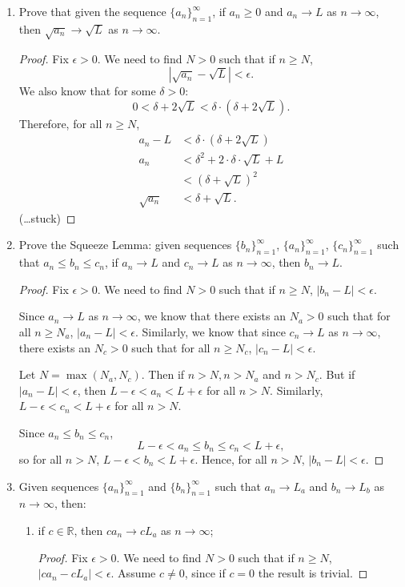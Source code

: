 \documentclass[12pt]{amsart}
\begin{document}
\begin{enumerate}
\item Prove that given the sequence $\{a_n\}_{n=1}^\infty$, if
  $a_n\geq 0$ and $a_n\rightarrow L$ as $n\rightarrow \infty$, then
  $\sqrt{a_n}\rightarrow \sqrt{L}$ as $n\rightarrow \infty$. 
  
\begin{proof}
Fix $\epsilon>0$. We need to find $N>0$ such that if $n\ge N$,
\[ \left| \sqrt{a_n} - \sqrt{L}\right| < \epsilon.\]
We also know that for some $\delta > 0$:
\[ 0< \delta +2\sqrt L < \delta \cdot (\delta + 2\sqrt L). \]
Therefore, for all $n\ge N$,
\begin{align*}
a_n - L &<  \delta \cdot (\delta + 2\sqrt L) \\
a_n &<\delta ^2+2 \cdot \delta\cdot\sqrt{L}+L \\
&<(\delta +\sqrt{L})^2 \\
\sqrt{a_n} &<\delta +\sqrt{L}.
\end{align*}
(\ldots stuck)
\end{proof}

\item Prove the Squeeze Lemma: given sequences $\{b_n\}_{n=1}^\infty$,
  $\{a_n\}_{n=1}^\infty$, $\{c_n\}_{n=1}^\infty$ such that $a_n\leq
  b_n\leq c_n$, if $a_n\rightarrow L$ and $c_n\rightarrow L$ as
  $n\rightarrow \infty$, then $b_n\rightarrow L$. 
  
\begin{proof}
Fix $\epsilon > 0$. We need to find $N>0$ such that if $n\ge N$, $|b_n-L|<\epsilon$.

Since $a_n \to L$ as $n\to\infty$, we know that there exists an $N_a>0$ such that for all $n\ge N_a$, $|a_n-L|<\epsilon$. Similarly, we know that since $c_n \to L$ as $n\to\infty$, there exists an $N_c>0$ such that for all $n\ge N_c$, $|c_n-L|<\epsilon$.

Let $N=\max(N_a, N_c)$. Then if $n>N, n>N_a$ and $n>N_c$. But if $|a_n-L| < \epsilon$, then $L-\epsilon < a_n < L + \epsilon$ for all $n>N$. Similarly, $L-\epsilon < c_n < L + \epsilon$ for all $n>N$.

Since $a_n\leq b_n\leq c_n$,
\[ L-\epsilon < a_n\leq b_n\leq c_n < L+\epsilon, \]
so for all $n>N$, $L-\epsilon < b_n < L +\epsilon$. Hence, for all $n>N$, $|b_n-L|<\epsilon$.

\end{proof}

\item Given sequences $\{a_n\}_{n=1}^\infty$ and
  $\{b_n\}_{n=1}^\infty$ such that $a_n\rightarrow L_a$  and $b_n
  \rightarrow L_b$ as $n\rightarrow \infty$, then:
\begin{enumerate}
\item if $c\in \mathbb{R}$, then $ca_n \rightarrow cL_a$ as
  $n\rightarrow \infty$;
  \begin{proof}
Fix $\epsilon > 0$.  We need to find $N>0$ such that if $n\ge N$, $|ca_n-cL_a|<\epsilon$. Assume $c\not=0$, since if $c=0$ the result is trivial.


\end{proof}
\end{enumerate}
\end{enumerate}
\end{document}
